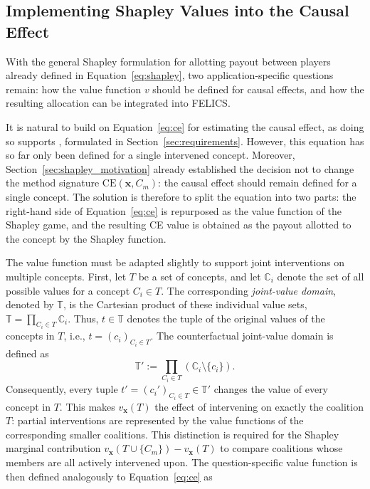 \subsection{Implementing Shapley Values into the Causal Effect}

With the general Shapley formulation for allotting payout between players already defined in Equation~\ref{eq:shapley}, two application-specific questions remain: how the value function $v$ should be defined for causal effects, and how the resulting allocation can be integrated into FELICS.

It is natural to build on Equation~\ref{eq:ce} for estimating the causal effect, as doing so supports , formulated in Section~\ref{sec:requirements}. However, this equation has so far only been defined for a single intervened concept. Moreover, Section~\ref{sec:shapley_motivation} already established the decision not to change the method signature $\mathrm{CE}(\mathbf{x},C_m)$: the causal effect should remain defined for a single concept. The solution is therefore to split the equation into two parts: the right-hand side of Equation~\ref{eq:ce} is repurposed as the value function of the Shapley game, and the resulting CE value is obtained as the payout allotted to the concept by the Shapley function.

The value function must be adapted slightly to support joint interventions on multiple concepts. First, let $T$ be a set of concepts, and let $\mathbb{C}_i$ denote the set of all possible values for a concept $C_i \in T$. The corresponding \emph{joint-value domain}, denoted by $\mathbb{T}$, is the Cartesian product of these individual value sets, $\mathbb{T} = \prod_{C_i \in T} \mathbb{C}_i$. Thus, $t \in \mathbb{T}$ denotes the tuple of the original values of the concepts in $T$, i.e., $t = (c_i)_{C_i \in T}$. The counterfactual joint-value domain is defined as
\begin{equation}
	\mathbb{T}' := \prod_{C_i\in T}\left(\mathbb{C}_i\setminus\{c_i\}\right).
\end{equation}
Consequently, every tuple $t'=(c_i')_{C_i\in T}\in\mathbb{T}'$ changes the value of every concept in $T$. This makes $v_{\mathbf{x}}(T)$ the effect of intervening on exactly the coalition $T$: partial interventions are represented by the value functions of the corresponding smaller coalitions. This distinction is required for the Shapley marginal contribution $v_{\mathbf{x}}(T\cup\{C_m\})-v_{\mathbf{x}}(T)$ to compare coalitions whose members are all actively intervened upon. The question-specific value function is then defined analogously to Equation~\ref{eq:ce} as

